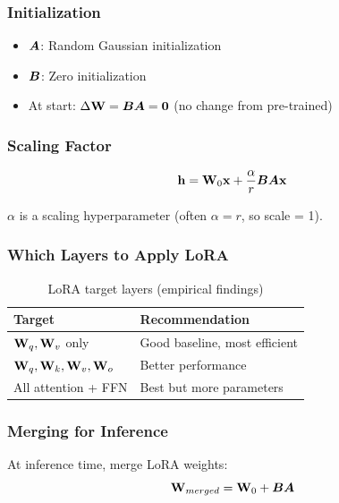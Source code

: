 \subsubsection{Initialization}

\begin{itemize}
    \item $\bm{A}$: Random Gaussian initialization
    \item $\bm{B}$: Zero initialization
    \item At start: $\Delta \mathbf{W} = \bm{B} \bm{A} = \bm{0}$ (no change from pre-trained)
\end{itemize}

\subsubsection{Scaling Factor}

\begin{equation}
\mathbf{h} = \mathbf{W}_0 \mathbf{x} + \frac{\alpha}{r} \bm{B} \bm{A} \mathbf{x}
\end{equation}

$\alpha$ is a scaling hyperparameter (often $\alpha = r$, so scale = 1).

\subsubsection{Which Layers to Apply LoRA}

\begin{table}[H]
\centering
\caption{LoRA target layers (empirical findings)}
\begin{tabularx}{\textwidth}{lX}
\toprule
\textbf{Target} & \textbf{Recommendation} \\
\midrule
$\mathbf{W}_q, \mathbf{W}_v$ only & Good baseline, most efficient \\
$\mathbf{W}_q, \mathbf{W}_k, \mathbf{W}_v, \mathbf{W}_o$ & Better performance \\
All attention + FFN & Best but more parameters \\
\bottomrule
\end{tabularx}
\end{table}

\subsubsection{Merging for Inference}

At inference time, merge LoRA weights:
\begin{equation}
\mathbf{W}_{merged} = \mathbf{W}_0 + \bm{B} \bm{A}
\end{equation}

